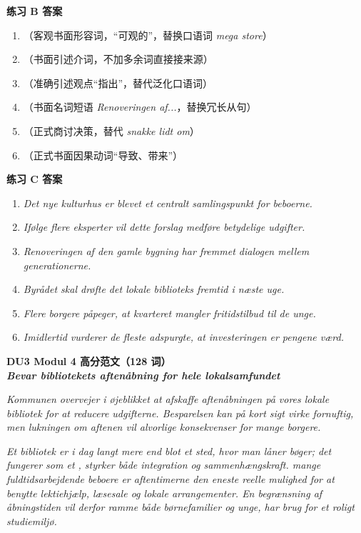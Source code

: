 \begin{answerbox}
\textbf{练习 B 答案}
\begin{enumerate}
  \item {}（客观书面形容词，“可观的”，替换口语词 \textit{mega store}）
  \item {}（书面引述介词，不加多余词直接接来源）
  \item {}（准确引述观点“指出”，替代泛化口语词）
  \item {}（书面名词短语 \textit{Renoveringen af...}，替换冗长从句）
  \item {}（正式商讨决策，替代 \textit{snakke lidt om}）
  \item {}（正式书面因果动词“导致、带来”）
\end{enumerate}

\textbf{练习 C 答案}
\begin{enumerate}
  \item \textit{Det nye kulturhus er blevet et centralt samlingspunkt for beboerne.}
  \item \textit{Ifølge flere eksperter vil dette forslag medføre betydelige udgifter.}
  \item \textit{Renoveringen af den gamle bygning har fremmet dialogen mellem generationerne.}
  \item \textit{Byrådet skal drøfte det lokale biblioteks fremtid i næste uge.}
  \item \textit{Flere borgere påpeger, at kvarteret mangler fritidstilbud til de unge.}
  \item \textit{Imidlertid vurderer de fleste adspurgte, at investeringen er pengene værd.}
\end{enumerate}

\textbf{DU3 Modul 4 高分范文（128 词）}\\
\textit{\textbf{Bevar bibliotekets aftenåbning for hele lokalsamfundet}}

\textit{Kommunen overvejer i øjeblikket at afskaffe aftenåbningen på vores lokale bibliotek for at reducere udgifterne. Besparelsen kan på kort sigt virke fornuftig, men lukningen om aftenen vil  alvorlige konsekvenser for mange borgere.}

\textit{Et bibliotek er i dag langt mere end blot et sted, hvor man låner bøger; det fungerer som et ,  styrker både integration og sammenhængskraft.  mange fuldtidsarbejdende beboere er aftentimerne den eneste reelle mulighed for at benytte lektiehjælp, læsesale og lokale arrangementer. En begrænsning af åbningstiden vil derfor ramme både børnefamilier og unge,  har brug for et roligt studiemiljø.}


\end{answerbox}
